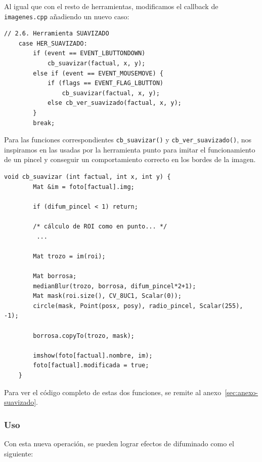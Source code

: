 \documentclass[11pt]{article}
\begin{document}
          \noindent
          Al igual que con el resto de herramientas, modificamos el callback de \texttt{imagenes.cpp} añadiendo un nuevo caso:

          \begin{lstlisting}[style=CppQtStyle]
    // 2.6. Herramienta SUAVIZADO
    case HER_SUAVIZADO:
        if (event == EVENT_LBUTTONDOWN)
            cb_suavizar(factual, x, y);
        else if (event == EVENT_MOUSEMOVE) {
            if (flags == EVENT_FLAG_LBUTTON)
                cb_suavizar(factual, x, y);
            else cb_ver_suavizado(factual, x, y);
        }
        break;
\end{lstlisting}

          Para las funciones correspondientes \texttt{cb\_suavizar()} y
          \texttt{cb\_ver\_suavizado()}, nos inspiramos en las usadas por la herramienta
          punto para imitar el funcionamiento de un pincel y conseguir un comportamiento
          correcto en los bordes de la imagen.

          \begin{lstlisting}[style=CppQtStyle]
    void cb_suavizar (int factual, int x, int y) {
        Mat &im = foto[factual].img;

        if (difum_pincel < 1) return;

        /* cálculo de ROI como en punto... */
         ...

        Mat trozo = im(roi);

        Mat borrosa;
        medianBlur(trozo, borrosa, difum_pincel*2+1);
        Mat mask(roi.size(), CV_8UC1, Scalar(0));
        circle(mask, Point(posx, posy), radio_pincel, Scalar(255), -1);

        borrosa.copyTo(trozo, mask);

        imshow(foto[factual].nombre, im);
        foto[factual].modificada = true;
    }
\end{lstlisting}

          Para ver el código completo de estas dos funciones, se remite al
          anexo~\ref{sec:anexo-suavizado}.

      \subsubsection{Uso}

          \noindent
          Con esta nueva operación, se pueden lograr efectos de difuminado como el siguiente:
\end{document}
